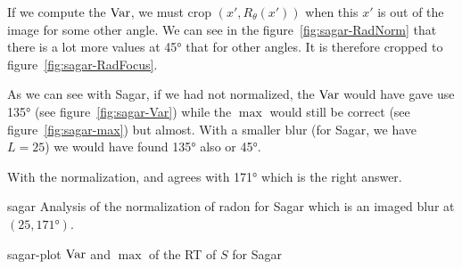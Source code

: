 If we compute the $\operatorname{Var}$, we must crop $(x',R_\theta(x'))$ when
this $x'$ is out of the image for some other angle.
We can see in the figure~\ref{fig:sagar-RadNorm} that
there is a lot more values at \ang{45} that for other angles.
It is therefore cropped to figure~\ref{fig:sagar-RadFocus}.

As we can see with Sagar, if we had not normalized,
the $\operatorname{Var}$ would have gave use \ang{135}
(see figure~\ref{fig:sagar-Var}) while the $\max$
would still be correct
(see figure~\ref{fig:sagar-max}) but almost.
With a smaller blur (for Sagar, we have $L = 25$) we would
have found \ang{135} also or \ang{45}.

With the normalization,  and
 agrees with \ang{171} which is the right
answer.

\begin{myfig}{sagar}
  {Analysis of the normalization of radon for Sagar which is an imaged blur at
  $(25,\ang{171})$.}
\end{myfig}
\begin{myfig}{sagar-plot}
  {$\operatorname{Var}$ and $\max$ of the RT of $S$ for Sagar}
\end{myfig}

